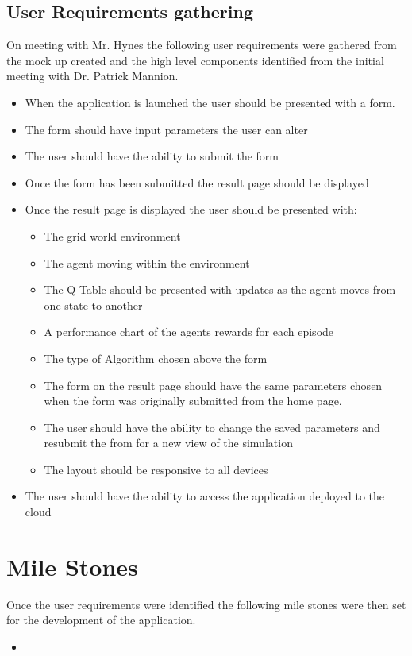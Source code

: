 \subsection {User Requirements gathering}
On meeting with Mr. Hynes the following user requirements were gathered from the mock up created and the high level components identified from the initial meeting with Dr. Patrick Mannion.
\begin{itemize}
	\item When the application is launched the user should be presented with a form.
	\item The form should have input parameters the user can alter
	\item The user should have the ability to submit the form
	\item Once the form has been submitted the result page should be displayed 
	\item Once the result page is displayed the user should be presented with:
	\begin{itemize}
		\item The grid world environment
		\item The agent moving within the environment
		\item The Q-Table should be presented with updates as the agent moves from one state to another
		\item A performance chart of the agents rewards for each episode 
		\item The type of Algorithm chosen above the form 
		\item The form on the result page should have the same parameters chosen when the form was originally submitted from the home page.
		\item The user should have the ability to change the saved parameters and resubmit the from for a new view of the simulation
		\item The layout should be responsive to all devices
		
	\end{itemize}
	\item The user should have the ability to access the application deployed to the cloud 
\end{itemize}
\section{Mile Stones}
Once the user requirements were identified the following mile stones were then set for the development of the application.
\begin{itemize}
	\item 
\end{itemize}
